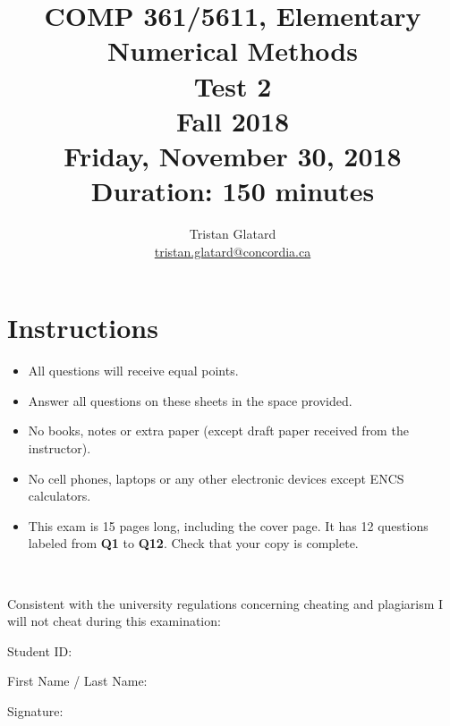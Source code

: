 \documentclass{llncs}
\title{COMP 361/5611, Elementary Numerical Methods \\ Test 2 \\ Fall 2018 \\ Friday, November 30, 2018 \\ Duration: 150 minutes}
\author{Tristan Glatard\\
  \href{mailto:tristan.glatard@concordia.ca}{tristan.glatard@concordia.ca}\\
  \vspace*{0.3cm}
  }
\institute{Concordia University\\
  Department of Computer Science and Software Engineering}
\newcounter{ques}
\newcommand{\myspace}[0]{\vspace*{0.25cm}}
\begin{document}
\maketitle

\section*{Instructions}
\begin{itemize}
\item All questions will receive equal points.
\item Answer all questions on these sheets in the space provided.
\item No books, notes or extra paper (except draft paper received from the instructor).
\item No cell phones, laptops or any other electronic devices except ENCS calculators.
\item This exam is 15 pages long, including the cover page. It has
  12 questions labeled from \textbf{Q1} to \textbf{Q12}. Check that your copy
  is complete.
\end{itemize}

\myspace

\myspace

\hrulefill\\

\myspace

Consistent with the university regulations concerning cheating and plagiarism I will not cheat during this examination:

\myspace

\myspace

Student ID: \dotfill

\myspace

\myspace

First Name / Last Name: \dotfill

\myspace

\myspace

Signature: \dotfill
\end{document}
